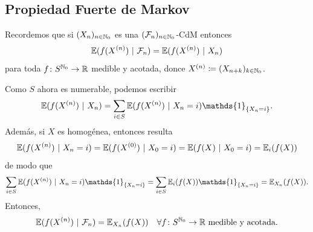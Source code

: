 \subsection{Propiedad Fuerte de Markov}

Recordemos que si $(X_{n})_{n \in \mathbb{N}_{0}}$ es una $(\mathcal{F}_{n})_{n \in \mathbb{N}_{0}}$-CdM entonces
\[ \mathbb{E}(f(X^{(n)}) \ | \ \mathcal{F}_{n}) = \mathbb{E}(f(X^{(n)}) \ | \ X_{n}) \]
para toda $f \colon S^{\mathbb{N}_{0}} \to \mathbb{R}$ medible y acotada, donce $X^{(n)} \coloneq (X_{n+k})_{k \in \mathbb{N}_{0}}$. \par
Como $S$ ahora es numerable, podemos escribir
\[ \mbb{E}(f(X^{(n)}) \ | \ X_{n}) = \sum_{i \in S} \mbb{E}(f(X^{(n)}) \ | \ X_{n} = i) \mathds{1}_{\{X_{n} = i\}}. \]
Además, si $X$ es homogénea, entonces resulta 
\[ \mathbb{E}(f(X^{(n)}) \ | \ X_{n} = i) = \mathbb{E}(f(X^{(0)}) \ | \ X_{0} = i) = \mathbb{E}(f(X) \ | \ X_{0} = i) = \mathbb{E}_{i}(f(X)) \]
de modo que
\[ \sum_{i \in S} \mbb{E}(f(X^{(n)}) \ | \ X_{n} = i) \mathds{1}_{\{X_{n} = i\}} = \sum_{i \in S} \mbb{E}_{i}(f(X)) \mathds{1}_{\{X_{n} = i\}} = \mbb{E}_{X_{n}}(f(X)). \]
Entonces,
\[ \mathbb{E}(f(X^{(n)}) \ | \ \mathcal{F}_{n}) = \mathbb{E}_{X_{n}}(f(X)) \quad \forall f \colon S^{\mathbb{N}_{0}} \to \mathbb{R} \text{ medible y acotada}. \]

